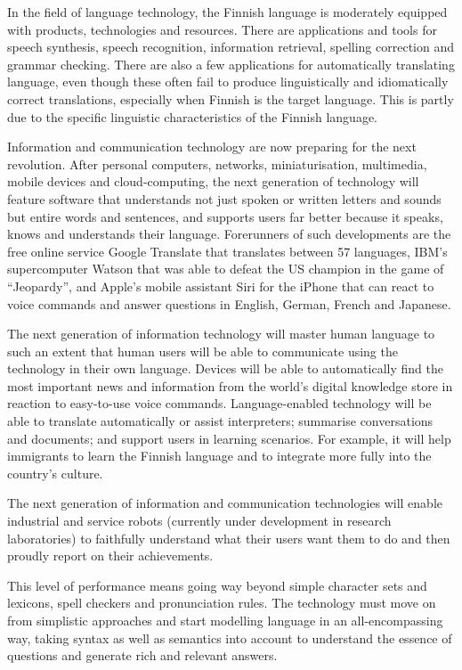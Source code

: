 \begin{multicols}{2}
In the field of language technology, the Finnish language is moderately equipped with products, technologies and resources. There are applications and tools for speech synthesis, speech recognition, information retrieval, spelling correction and grammar checking. There are also a few applications for automatically translating language, even though these often fail to produce linguistically and idiomatically correct translations, especially when Finnish is the target language. This is partly due to the specific linguistic characteristics of the Finnish language.

Information and communication technology are now preparing for the next revolution. After personal computers, networks, miniaturisation, multimedia, mobile devices and cloud-computing, the next generation of technology will feature software that understands not just spoken or written letters and sounds but entire words and sentences, and supports users far better because it speaks, knows and understands their language. Forerunners of such developments are the free online service Google Translate that translates between 57 languages, IBM’s supercomputer Watson that was able to defeat the US champion in the game of ``Jeopardy'', and Apple’s mobile assistant Siri for the iPhone that can react to voice commands and answer questions in English, German, French and Japanese. 

The next generation of information technology will master human language to such an extent that human users will be able to communicate using the technology in their own language. Devices will be able to automatically find the most important news and information from the world’s digital knowledge store in reaction to easy-to-use voice commands. Language-enabled technology will be able to translate automatically or assist interpreters; summarise conversations and documents; and support users in learning scenarios. For example, it will help immigrants to learn the Finnish language and to integrate more fully into the country’s culture.

The next generation of information and communication technologies will enable industrial and service robots (currently under development in research laboratories) to faithfully understand what their users want them to do and then proudly report on their achievements.  

This level of performance means going way beyond simple character sets and lexicons, spell checkers and pronunciation rules. The technology must move on from simplistic approaches and start modelling language in an all-encompassing way, taking syntax as well as semantics into account to understand the essence of questions and generate rich and relevant answers.


\end{multicols}
